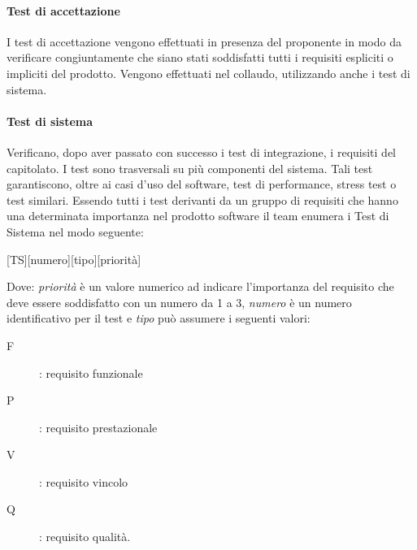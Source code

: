 \documentclass[../../norme-di-progetto.tex]{subfiles}
\begin{document}
\paragraph{Test di accettazione}
I test di accettazione vengono effettuati in presenza del proponente in modo da verificare congiuntamente che siano stati soddisfatti tutti i requisiti espliciti o impliciti del prodotto.
Vengono effettuati nel collaudo, utilizzando anche i test di sistema.

\paragraph{Test di sistema}
Verificano, dopo aver passato con successo i test di integrazione, i requisiti del capitolato. I test sono trasversali su più componenti del sistema.
Tali test garantiscono, oltre ai casi d'uso del software, test di performance, stress test o test similari.
Essendo tutti i test derivanti da un gruppo di requisiti che hanno una determinata importanza nel prodotto software il team enumera i Test di Sistema nel modo seguente:
\begin{center}
    [TS][numero][tipo][priorità]
\end{center}
Dove: \textit{priorità} è un valore numerico ad indicare l'importanza del requisito che deve essere soddisfatto con un numero da 1 a 3, \textit{numero} è un numero identificativo per il test e \textit{tipo} può assumere i seguenti valori:
\begin{description}
  \item [F]: requisito funzionale
  \item [P]: requisito prestazionale
  \item [V]: requisito vincolo
  \item [Q]: requisito qualità.
\end{description}
\end{document}
